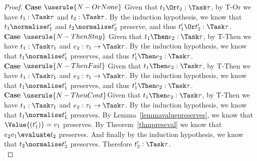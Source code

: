 \begin{proof}
  \noindent\textbf{Case} $\userule{N-OrNone}$ Given that $t_1\Or t_2:\Task\tau$,
  by T-Or we have $t_1:\Task\tau$ and $t_2:\Task\tau$. By the induction hypothesis,
  we know that $t_1\normalise t_1'$ and $t_2\normalise t_2'$ preserve, and thus
  $t_1'\Or t_2':\Task\tau$.\\

  \noindent\textbf{Case} $\userule{N-ThenStay}$ Given that $t_1\Then e_2:\Task\tau$,
  by T-Then we have $t_1:\Task\tau_1$ and $e_2:\tau_1\to\Task\tau$. By the induction
  hypothesis, we know that $t_1\normalise t_1'$ preserves, and thus $t_1'\Then e_2:\Task\tau$.\\

  \noindent\textbf{Case} $\userule{N-ThenFail}$ Given that $t_1\Then e_2:\Task\tau$,
  by T-Then we have $t_1:\Task\tau_1$ and $e_2:\tau_1\to\Task\tau$. By the induction
  hypothesis, we know that $t_1\normalise t_1'$ preserves, and thus $t_1'\Then e_2:\Task\tau$.\\

  \noindent\textbf{Case} $\userule{N-ThenCont}$Given that $t_1\Then e_2:\Task\tau$,
  by T-Then we have $t_1:\Task\tau_1$ and $e_2:\tau_1\to\Task\tau$. By the induction
  hypothesis, we know that $t_1\normalise t_1'$ preserves. By
  Lemma~\ref{lemmavaluepreserves}, we know that $\Value{(t_1')}=v_1$ preserves.
  By Theorem~\ref{thmpreseval} we know that $e_2 v_1\evaluate t_2$ preserves. And
  finally by the induction hypothesis, we know that $t_2\normalise t_2'$ preserves.
  Therefore $t_2':\Task\tau$.\\

\end{proof}

